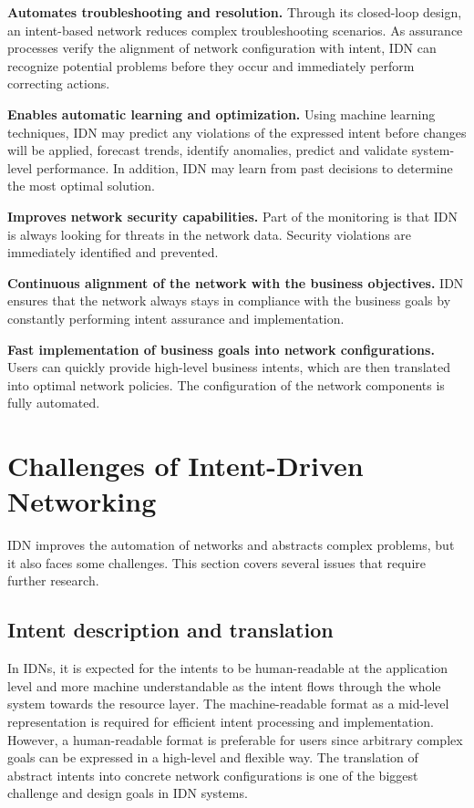 \textbf{Automates troubleshooting and resolution.} Through its closed-loop design, an intent-based network reduces complex troubleshooting scenarios. As assurance processes verify the alignment of network configuration with intent, IDN can recognize potential problems before they occur and immediately perform correcting actions.

\textbf{Enables automatic learning and optimization.} Using machine learning techniques, IDN may predict any violations of the expressed intent before changes will be applied, forecast trends, identify anomalies, predict and validate system-level performance. In addition, IDN may learn from past decisions to determine the most optimal solution.

\textbf{Improves network security capabilities.} Part of the monitoring is that IDN is always looking for threats in the network data. Security violations are immediately identified and prevented.

\textbf{Continuous alignment of the network with the business objectives.} IDN ensures that the network always stays in compliance with the business goals by constantly performing intent assurance and implementation.

\textbf{Fast implementation of business goals into network configurations.} Users can quickly provide high-level business intents, which are then translated into optimal network policies. The configuration of the network components is fully automated.



\section{Challenges of Intent-Driven Networking}

IDN improves the automation of networks and abstracts complex problems, but it also faces some challenges. This section covers several issues that require further research.

\subsection{Intent description and translation}
In IDNs, it is expected for the intents to be human-readable at the application level and more machine understandable as the intent flows through the whole system towards the resource layer. The machine-readable format as a mid-level representation is required for efficient intent processing and implementation. However, a human-readable format is preferable for users since arbitrary complex goals can be expressed in a high-level and flexible way. The translation of abstract intents into concrete network configurations is one of the biggest challenge and design goals in IDN systems.

